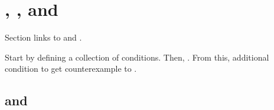 \section{, \qWhyV{}, and \issueConstraint{}}
\label{sec:comining-ingredients}

\begin{note}
  Section links  to \qWhyV{} and \issueConstraint{}.

  Start by defining a collection of conditions.
  Then, \qWhy{}.
  From this, additional condition to get counterexample to \issueConstraint{}.
\end{note}

\subsection{ and \qWhyV{}}

